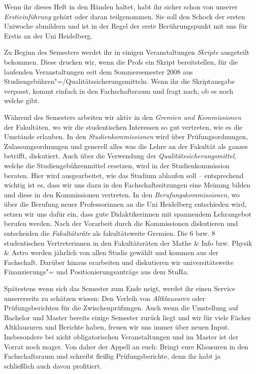 Wenn ihr dieses Heft in den Händen haltet, habt ihr sicher schon von unserer \emph{Erstieinführung} gehört oder daran teilgenommen. Sie soll den Schock der ersten Uniwoche abmildern und ist in der Regel der erste Berührungspunkt mit uns für Erstis an der Uni Heidelberg.

Zu Beginn des Semesters werdet ihr in einigen Veranstaltungen \emph{Skripte} ausgeteilt bekommen. Diese drucken wir, wenn die Profs ein Skript bereitstellen, für die laufenden Veranstaltungen seit dem Sommersemester 2008 aus Studiengebühren"=/Qualitätssicherungsmitteln. Wenn ihr die Skriptausgabe verpasst, kommt einfach in den Fachschaftsraum und fragt nach, ob es noch welche gibt.

Während des Semesters arbeiten wir aktiv in den \emph{Gremien und Kommissionen} der Fakultäten, wo wir die studentischen Interessen so gut vertreten, wie es die Umstände erlauben. In den \emph{Studienkommissionen} wird über Prüfungsordnungen, Zulassungsordnungen und generell alles was die Lehre an der Fakultät als ganzes betrifft, diskutiert. Auch über die Verwendung der \emph{Qualitätssicherungsmittel}, welche die Studiengebührenmittel ersetzen, wird in der Studienkommission beraten. Hier wird ausgearbeitet, wie das Studium ablaufen soll -- entsprechend wichtig ist es, dass wir uns dazu in den Fachschaftssitzungen eine Meinung bilden und diese in den Kommissionen vertreten. In den \emph{Berufungskommissionen}, wo über die Berufung neuer Professorinnen an die Uni Heidelberg entschieden wird, setzen wir uns dafür ein, dass gute Didaktikerinnen mit spannendem Lehrangebot berufen werden. Nach der Vorarbeit durch die Kommissionen diskutieren und entscheiden die \emph{Fakultätsräte} als fakultätsweite Gremien. Die 6 bzw. 8 studentischen Vertreterinnen in den Fakultätsräten der Mathe \& Info bzw. Physik \& Astro werden jährlich von allen Studis gewählt und kommen aus der Fachschaft. Darüber hinaus erarbeiten und diskutieren wir universitätsweite Finanzierungs"= und Positionierungsanträge aus dem \gls{StuRa}.

Spätestens wenn sich das Semester zum Ende neigt, werdet ihr einen Service unsererseits zu schätzen wissen: Den Verleih von \emph{Altklausuren} oder Prüfungsberichten für die Zwischenprüfungen. Auch wenn die Umstellung auf Bachelor und Master bereits einige Semester zurück liegt und wir für viele Fächer Altklausuren und Berichte haben, freuen wir uns immer über neuen Input. Insbesondere bei nicht obligatorischen Veranstaltungen und im Master ist der Vorrat noch mager. Von daher der Appell an euch: Bringt eure Klausuren in den Fachschaftsraum und schreibt fleißig Prüfungsberichte, denn ihr habt ja schließlich auch davon profitiert.


